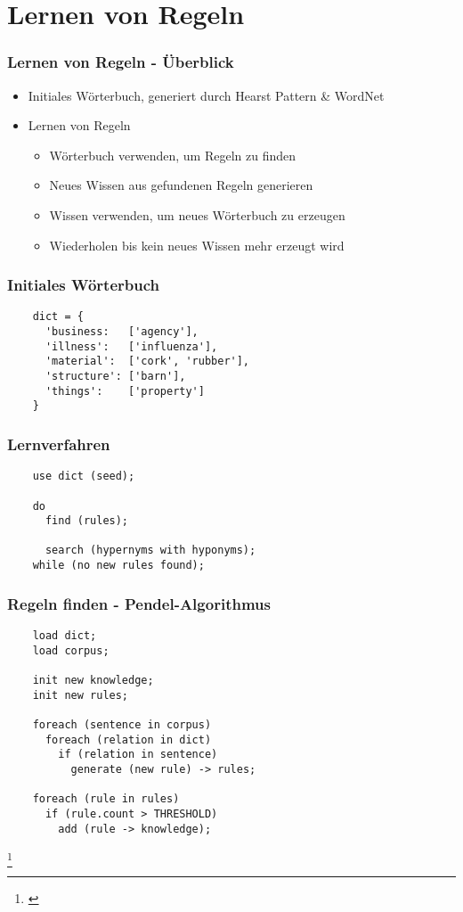 \section{Lernen von Regeln}
\label{sec:iteratives-lernen}

\begin{frame}
  \frametitle{Lernen von Regeln - Überblick}

  \begin{itemize}
  \item Initiales Wörterbuch, generiert durch Hearst Pattern \& WordNet
  \item Lernen von Regeln
    \begin{itemize}
    \item Wörterbuch verwenden, um Regeln zu finden
    \item Neues Wissen aus gefundenen Regeln generieren
    \item Wissen verwenden, um neues Wörterbuch zu erzeugen
    \item Wiederholen bis kein neues Wissen mehr erzeugt wird
    \end{itemize}
  \end{itemize}
\end{frame}

\begin{frame}[fragile]
  \frametitle{Initiales Wörterbuch}

  \begin{lstlisting}
    dict = {
      'business:   ['agency'],
      'illness':   ['influenza'],
      'material':  ['cork', 'rubber'],
      'structure': ['barn'],
      'things':    ['property']
    }
  \end{lstlisting}
\end{frame}

\begin{frame}[fragile]
  \frametitle{Lernverfahren}

  \begin{lstlisting}
    use dict (seed);

    do
      find (rules);

      search (hypernyms with hyponyms);
    while (no new rules found);
  \end{lstlisting}
\end{frame}

\begin{frame}[fragile]
  \frametitle{Regeln finden - Pendel-Algorithmus}

  \begin{lstlisting}
    load dict;
    load corpus;
    
    init new knowledge;
    init new rules;

    foreach (sentence in corpus)
      foreach (relation in dict)
        if (relation in sentence)
          generate (new rule) -> rules;

    foreach (rule in rules)
      if (rule.count > THRESHOLD)
        add (rule -> knowledge);
  \end{lstlisting}

  \let\thefootnote\relax\footnote{\cite{Biemann:2003}}
\end{frame}

